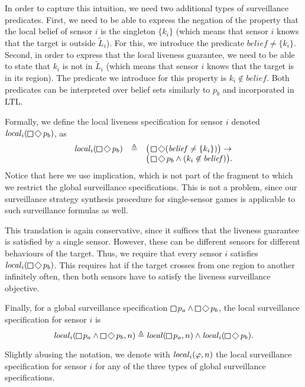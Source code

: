 In order to capture this intuition, we need two additional types of surveillance predicates. First, we need to be able to express the negation of the property that the local belief of sensor $i$ is the singleton $\{k_i\}$ (which means that sensor $i$ knows that the target is outside $\widetilde L_i$). For this, we introduce the predicate $\mathit{belief} \neq \{k_i\}$. Second, in order to express that the local liveness guarantee, we need to be able to state that $k_i$ is not in $\widetilde L_i$ (which means that sensor $i$ knows that the target is in its region). The predicate we introduce for this property is $k_i \not\in\mathit{belief}$. Both predicates can be interpreted over belief sets similarly to $p_b$ and incorporated in LTL.
 
Formally, we define the local liveness specification for sensor $i$ denoted $\locspec_i(\LTLglobally\LTLfinally p_b)$, as
\[
\begin{array}{lll}
\locspec_i(\LTLglobally\LTLfinally p_b) & \triangleq &
\big(\LTLglobally\LTLfinally (\mathit{belief} \neq \{k_i\} )\big)\rightarrow\\&& \big(\LTLglobally\LTLfinally p_b \wedge (k_i \not\in\mathit{belief})\big).
\end{array}
\]
Notice that here we use implication, which is not part of the fragment to which we restrict the global surveillance specifications. This is not a problem, since our surveillance strategy synthesis procedure for single-sensor games is applicable to such surveillance formulas as well.

This translation is again conservative, since it suffices that the liveness guarantee is satisfied by a single sensor. However, these can be different sensors for different behaviours of the target. Thus, we require that every sensor $i$ satisfies $\locspec_i(\LTLglobally\LTLfinally p_b)$. This requires hat if the target crosses from one region to another infinitely often, then both sensors have to satisfy the liveness surveillance objective.

Finally, for a global surveillance specification $\LTLglobally p_a \wedge \LTLglobally\LTLfinally p_b$, the local surveillance specification for sensor $i$ is
\[\locspec_i(\LTLglobally p_a\wedge  \LTLglobally\LTLfinally p_b,n)\triangleq
\locspec(\LTLglobally p_a,n) \wedge\locspec_i(\LTLglobally\LTLfinally p_b) .
\]

Slightly abusing the notation, we denote with $\mathit{local}_i(\varphi,n)$ the local surveillance specification for sensor $i$ for any of the three types of global surveillance specifications.

